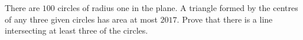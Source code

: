 There are $100$ circles of radius one in the plane. A triangle formed by the centres of any three given circles has area at most $2017$. Prove that there is a line intersecting at least three of the circles.